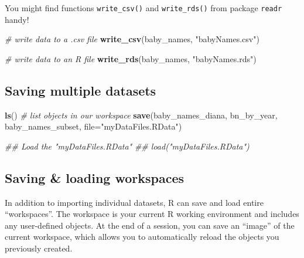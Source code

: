 \documentclass[
]{book}
\newenvironment{Shaded}{\begin{snugshade}}{\end{snugshade}}
\newcommand{\CommentTok}[1]{\textcolor[rgb]{0.56,0.35,0.01}{\textit{#1}}}
\newcommand{\DataTypeTok}[1]{\textcolor[rgb]{0.13,0.29,0.53}{#1}}
\newcommand{\KeywordTok}[1]{\textcolor[rgb]{0.13,0.29,0.53}{\textbf{#1}}}
\newcommand{\NormalTok}[1]{#1}
\newcommand{\StringTok}[1]{\textcolor[rgb]{0.31,0.60,0.02}{#1}}
\begin{document}
You might find functions \texttt{write\_csv()} and \texttt{write\_rds()} from package
\texttt{readr} handy!

\begin{Shaded}
\begin{Highlighting}[]
\CommentTok{# write data to a .csv file}
\KeywordTok{write_csv}\NormalTok{(baby_names, }\StringTok{"babyNames.csv"}\NormalTok{)}
\end{Highlighting}
\end{Shaded}

\begin{Shaded}
\begin{Highlighting}[]
\CommentTok{# write data to an R file}
\KeywordTok{write_rds}\NormalTok{(baby_names, }\StringTok{"babyNames.rds"}\NormalTok{)}
\end{Highlighting}
\end{Shaded}

\hypertarget{saving-multiple-datasets}{%
\subsection{Saving multiple datasets}\label{saving-multiple-datasets}}

\begin{Shaded}
\begin{Highlighting}[]
\KeywordTok{ls}\NormalTok{() }\CommentTok{# list objects in our workspace}
\KeywordTok{save}\NormalTok{(baby_names_diana, bn_by_year, baby_names_subset, }\DataTypeTok{file=}\StringTok{"myDataFiles.RData"}\NormalTok{)  }
\end{Highlighting}
\end{Shaded}

\begin{Shaded}
\begin{Highlighting}[]
\CommentTok{## Load the "myDataFiles.RData"}
\CommentTok{## load("myDataFiles.RData") }
\end{Highlighting}
\end{Shaded}

\hypertarget{saving-loading-workspaces}{%
\subsection{Saving \& loading workspaces}\label{saving-loading-workspaces}}

In addition to importing individual datasets, R can save and load entire
``workspaces''. The workspace is your current R working environment and includes
any user-defined objects. At the end of a session, you can save an ``image''
of the current workspace, which allows you to automatically reload the objects
you previously created.
\end{document}
